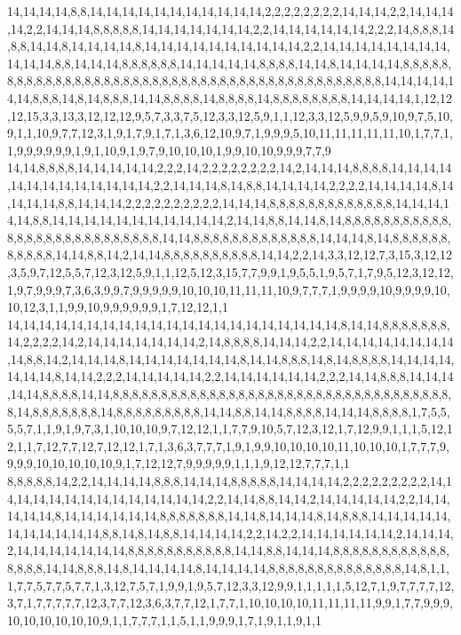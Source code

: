 14,14,14,14,8,8,14,14,14,14,14,14,14,14,14,14,14,2,2,2,2,2,2,2,2,14,14,14,2,2,14,14,14,14,2,2,14,14,14,8,8,8,8,8,14,14,14,14,14,14,14,2,2,14,14,14,14,14,14,2,2,2,14,8,8,8,14,8,8,14,14,8,14,14,14,14,8,14,14,14,14,14,14,14,14,14,14,2,2,14,14,14,14,14,14,14,14,14,14,14,8,8,14,14,14,8,8,8,8,8,8,14,14,14,14,14,8,8,8,8,14,14,8,14,14,14,14,8,8,8,8,8,8,8,8,8,8,8,8,8,8,8,8,8,8,8,8,8,8,8,8,8,8,8,8,8,8,8,8,8,8,8,8,8,8,8,8,8,8,8,8,14,14,14,14,14,14,8,8,8,14,8,14,8,8,8,14,14,8,8,8,8,14,8,8,8,8,14,8,8,8,8,8,8,8,8,14,14,14,14,1,12,12,12,15,3,3,13,3,12,12,12,9,5,7,3,3,7,5,12,3,3,12,5,9,1,1,12,3,3,12,5,9,9,5,9,10,9,7,5,10,9,1,1,10,9,7,7,12,3,1,9,1,7,9,1,7,1,3,6,12,10,9,7,1,9,9,9,5,10,11,11,11,11,11,10,1,7,7,1,1,9,9,9,9,9,9,1,9,1,10,9,1,9,7,9,10,10,10,1,9,9,10,10,9,9,9,7,7,9
14,14,8,8,8,8,14,14,14,14,14,2,2,2,14,2,2,2,2,2,2,2,2,14,2,14,14,14,8,8,8,8,14,14,14,14,14,14,14,14,14,14,14,14,14,2,2,14,14,14,8,14,8,8,14,14,14,14,2,2,2,2,14,14,14,14,8,14,14,14,14,8,8,14,14,14,2,2,2,2,2,2,2,2,2,2,14,14,14,8,8,8,8,8,8,8,8,8,8,8,8,8,14,14,14,14,14,8,8,14,14,14,14,14,14,14,14,14,14,14,2,14,14,8,8,14,14,8,14,8,8,8,8,8,8,8,8,8,8,8,8,8,8,8,8,8,8,8,8,8,8,8,8,8,8,8,14,14,8,8,8,8,8,8,8,8,8,8,8,8,8,14,14,14,8,14,8,8,8,8,8,8,8,8,8,8,8,14,14,8,8,14,2,14,14,8,8,8,8,8,8,8,8,8,8,14,14,2,2,14,3,3,12,12,7,3,15,3,12,12,3,5,9,7,12,5,5,7,12,3,12,5,9,1,1,12,5,12,3,15,7,7,9,9,1,9,5,5,1,9,5,7,1,7,9,5,12,3,12,12,1,9,7,9,9,9,7,3,6,3,9,9,7,9,9,9,9,9,10,10,10,11,11,11,10,9,7,7,7,1,9,9,9,9,10,9,9,9,9,10,10,12,3,1,1,9,9,10,9,9,9,9,9,9,1,7,12,12,1,1
14,14,14,14,14,14,14,14,14,14,14,14,14,14,14,14,14,14,14,14,14,8,14,14,8,8,8,8,8,8,8,14,2,2,2,2,14,2,14,14,14,14,14,14,14,2,14,8,8,8,8,14,14,14,2,2,14,14,14,14,14,14,14,14,14,8,8,14,2,14,14,14,8,14,14,14,14,14,14,14,8,14,14,8,8,8,14,8,14,8,8,8,8,14,14,14,14,14,14,14,8,14,14,2,2,2,14,14,14,14,14,2,2,14,14,14,14,14,14,2,2,2,14,14,8,8,8,14,14,14,14,14,8,8,8,8,14,14,8,8,8,8,8,8,8,8,8,8,8,8,8,8,8,8,8,8,8,8,8,8,8,8,8,8,8,8,8,8,8,8,8,8,8,8,14,8,8,8,8,8,8,8,14,8,8,8,8,8,8,8,8,8,14,14,8,8,14,14,8,8,8,8,14,14,14,8,8,8,8,1,7,5,5,5,5,7,1,1,9,1,9,7,3,1,10,10,10,9,7,12,12,1,1,7,7,9,10,5,7,12,3,12,1,7,12,9,9,1,1,1,5,12,12,1,1,7,12,7,7,12,7,12,12,1,7,1,3,6,3,7,7,7,1,9,1,9,9,10,10,10,10,11,10,10,10,1,7,7,7,9,9,9,9,10,10,10,10,10,9,1,7,12,12,7,9,9,9,9,9,1,1,1,9,12,12,7,7,7,1,1
8,8,8,8,8,14,2,2,14,14,14,14,8,8,8,14,14,14,8,8,8,8,8,14,14,14,14,2,2,2,2,2,2,2,2,2,14,14,14,14,14,14,14,14,14,14,14,14,14,14,2,2,14,14,8,8,14,14,2,14,14,14,14,14,2,2,14,14,14,14,14,8,14,14,14,14,14,14,8,8,8,8,8,8,8,14,14,8,14,14,14,8,14,8,8,8,14,14,14,14,14,14,14,14,14,14,14,8,8,14,8,14,8,8,14,14,14,14,2,2,14,2,2,14,14,14,14,14,14,2,14,14,14,2,14,14,14,14,14,14,14,8,8,8,8,8,8,8,8,8,8,8,14,14,8,8,14,14,14,8,8,8,8,8,8,8,8,8,8,8,8,8,8,8,8,14,14,8,8,8,14,8,14,14,14,14,8,14,14,14,14,8,8,8,8,8,8,8,8,8,8,8,8,8,8,14,8,1,1,1,7,7,5,7,7,5,7,7,1,3,12,7,5,7,1,9,9,1,9,5,7,12,3,3,12,9,9,1,1,1,1,1,5,12,7,1,9,7,7,7,7,12,3,7,1,7,7,7,7,7,12,3,7,7,12,3,6,3,7,7,12,1,7,7,1,10,10,10,10,11,11,11,11,9,9,1,7,7,9,9,9,10,10,10,10,10,10,9,1,1,7,7,7,1,1,5,1,1,9,9,9,1,7,1,9,1,1,9,1,1
